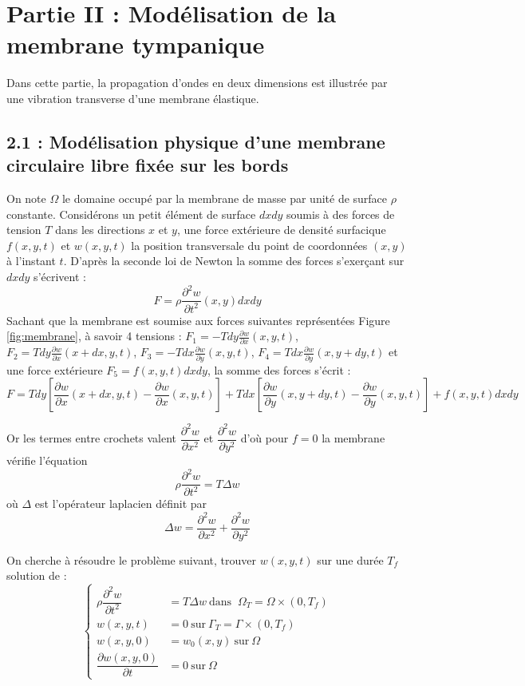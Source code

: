 \documentclass[a4,12pt]{article}
\begin{document}
  \section*{Partie II : Modélisation de la membrane tympanique}

  Dans cette partie, la propagation d'ondes en deux dimensions est illustrée par une vibration transverse d'une membrane élastique.

  \subsection*{2.1 : Modélisation physique d'une membrane circulaire libre fixée sur les bords}

  On note $\Omega$ le domaine occupé par la membrane de masse par unité de surface $\rho$ constante. Considérons un petit élément de surface $dxdy$ soumis à des forces de tension $T$  dans les directions $x$ et $y$, une force extérieure de densité surfacique $f(x,y,t)$ et $w(x,y,t)$ la position transversale du point de coordonnées $(x,y)$ à l'instant $t$. D'après la seconde loi de Newton la somme des forces s'exerçant sur $dxdy$ s'écrivent : 
  \[
    F=\rho  \frac{\partial^2 w}{\partial t^2}(x,y)dxdy
  \]
  Sachant que la membrane est soumise aux forces suivantes représentées Figure \ref{fig:membrane}, à savoir 4 tensions : $F_1=-Tdy\frac{\partial w}{\partial x}(x,y,t)$, $F_2=Tdy\frac{\partial w}{\partial x}(x+dx,y,t)$, $F_3=-Tdx\frac{\partial w}{\partial y}(x,y,t)$, $F_4=Tdx\frac{\partial w}{\partial y}(x,y+dy,t)$ et une force extérieure $F_5=f(x,y,t)dxdy$, la somme des forces s'écrit : 
  \[
    F=Tdy\left[\frac{\partial w}{\partial x}(x+dx,y,t)-\frac{\partial w}{\partial x}(x,y,t)\right]+Tdx\left[\frac{\partial w}{\partial y}(x,y+dy,t)-\frac{\partial w}{\partial y}(x,y,t)\right]+f(x,y,t)dxdy
  \]

  Or les termes entre crochets valent $\dfrac{\partial^2 w}{\partial x^2}$ et $\dfrac{\partial^2 w}{\partial y^2}$ d'où pour $f=0$ la membrane vérifie l'équation 
  \[
    \rho \dfrac{\partial^2 w}{\partial t^2}=T \Delta w
  \]
  où $\Delta$ est l'opérateur laplacien définit par 
  \[
    \Delta w=\dfrac{\partial^2 w}{\partial x^2}+\dfrac{\partial^2 w}{\partial y^2}
  \]


  On cherche à résoudre le problème suivant, trouver $w(x,y,t)$ sur une durée $T_f$ solution de :
  \begin{equation}
    \left\{
      \begin{array}{rl}
	\rho \dfrac{\partial^2 w}{\partial t^2} & =  T \Delta w ~\textrm{dans } ~ \Omega_T = \Omega \times (0,T_f)\\ 
	w(x,y,t)& =  0 ~\textrm{sur} ~ \Gamma_T=\Gamma \times (0,T_f)\\
	w(x,y,0)& = w_0(x,y) ~ \textrm{sur} ~\Omega \\
	\dfrac{\partial w(x,y,0)}{\partial t} & = 0 ~\textrm{sur} ~\Omega 
      \end{array}
      \right.
      \label{eq:membranemodel}
    \end{equation}
\end{document}
